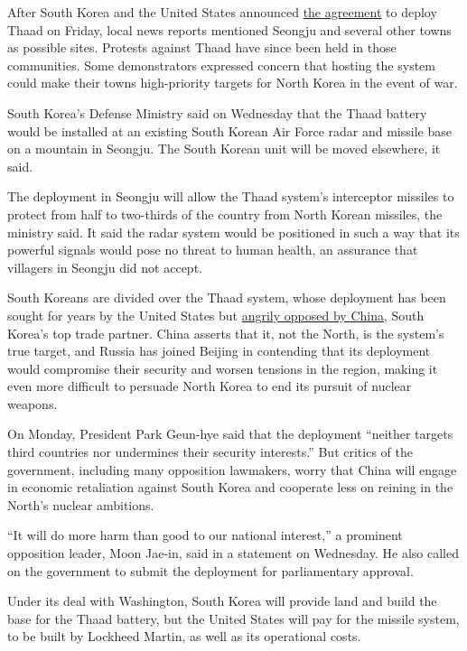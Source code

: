 After South Korea and the United States announced
\href{http://www.nytimes3xbfgragh.onion/2016/07/08/world/asia/south-korea-and-us-agree-to-deploy-missile-defense-system.html}{the
agreement} to deploy Thaad on Friday, local news reports mentioned
Seongju and several other towns as possible sites. Protests against
Thaad have since been held in those communities. Some demonstrators
expressed concern that hosting the system could make their towns
high-priority targets for North Korea in the event of war.

South Korea's Defense Ministry said on Wednesday that the Thaad battery
would be installed at an existing South Korean Air Force radar and
missile base on a mountain in Seongju. The South Korean unit will be
moved elsewhere, it said.

The deployment in Seongju will allow the Thaad system's interceptor
missiles to protect from half to two-thirds of the country from North
Korean missiles, the ministry said. It said the radar system would be
positioned in such a way that its powerful signals would pose no threat
to human health, an assurance that villagers in Seongju did not accept.

South Koreans are divided over the Thaad system, whose deployment has
been sought for years by the United States but
\href{http://www.nytimes3xbfgragh.onion/2016/07/09/world/asia/south-korea-us-thaad-china.html}{angrily
opposed by China}, South Korea's top trade partner. China asserts that
it, not the North, is the system's true target, and Russia has joined
Beijing in contending that its deployment would compromise their
security and worsen tensions in the region, making it even more
difficult to persuade North Korea to end its pursuit of nuclear weapons.

On Monday, President Park Geun-hye said that the deployment ``neither
targets third countries nor undermines their security interests.'' But
critics of the government, including many opposition lawmakers, worry
that China will engage in economic retaliation against South Korea and
cooperate less on reining in the North's nuclear ambitions.

``It will do more harm than good to our national interest,'' a prominent
opposition leader, Moon Jae-in, said in a statement on Wednesday. He
also called on the government to submit the deployment for parliamentary
approval.

Under its deal with Washington, South Korea will provide land and build
the base for the Thaad battery, but the United States will pay for the
missile system, to be built by Lockheed Martin, as well as its
operational costs.

